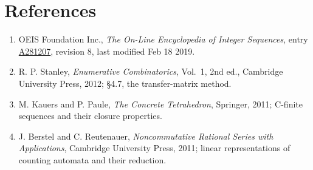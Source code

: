 \documentclass[11pt]{article}
\theoremstyle{definition}
\begin{document}
\section{References}

\begin{enumerate}

\item OEIS Foundation Inc., \emph{The On-Line Encyclopedia of Integer Sequences}, entry \href{https://oeis.org/A281207}{A281207}, revision 8, last modified Feb 18 2019.

\item R. P. Stanley, \emph{Enumerative Combinatorics}, Vol.~1, 2nd ed., Cambridge University Press, 2012; \S4.7, the transfer-matrix method.

\item M. Kauers and P. Paule, \emph{The Concrete Tetrahedron}, Springer, 2011; C-finite sequences and their closure properties.

\item J. Berstel and C. Reutenauer, \emph{Noncommutative Rational Series with Applications}, Cambridge University Press, 2011; linear representations of counting automata and their reduction.

\end{enumerate}
\end{document}
